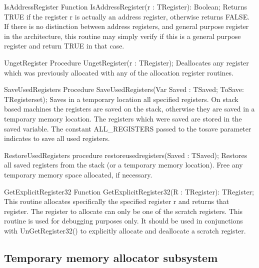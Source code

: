 \documentclass [a4paper,12pt]{article}
\begin{document}
\begin{function}{IsAddressRegister}
\Declaration
Function IsAddressRegister(r : TRegister): Boolean;
\Description
Returns TRUE if the register r is actually an address register, otherwise
returns FALSE.
\Notes
If there is no distinction between address registers, and general purpose
register in the architecture, this routine may simply verify if this is a
general purpose register and return TRUE in that case.
\end{function}

\begin{procedure}{UngetRegister}
\Declaration
Procedure UngetRegister(r : TRegister);
\Description
Deallocates any register which was previously allocated with any of the
allocation register routines.
\end{procedure}

\begin{function}{SaveUsedRegisters}
\Declaration
Procedure SaveUsedRegisters(Var Saved : TSaved; ToSave: TRegisterset);
\Description
Saves in a temporary location all specified registers. On stack based
machines the registers are saved on the stack, otherwise they are saved in a
temporary memory location. The registers which were saved are stored in the
\textsf{saved} variable. The constant \textsf{ALL{\_}REGISTERS} passed to
the \textsf{tosave} parameter indicates to save all used registers.
\end{function}

\begin{function}{RestoreUsedRegisters}
\Declaration
procedure restoreusedregisters(Saved : TSaved);
\Description
Restores all saved registers from the stack (or a temporary memory
location). Free any temporary memory space allocated, if necessary.
\end{function}

\begin{function}{GetExplicitRegister32}
\Declaration
Function GetExplicitRegister32(R : TRegister): TRegister;
\Description
This routine allocates specifically the specified register \textsf{r} and
returns that register. The register to allocate can only be one of the
scratch registers.
\Notes
This routine is used for debugging purposes only. It should be used in
conjunctions with UnGetRegister32() to explicitly allocate and deallocate a
scratch register.
\end{function}

\subsection{Temporary memory allocator subsystem}
\label{subsec:temporary}
\end{document}
